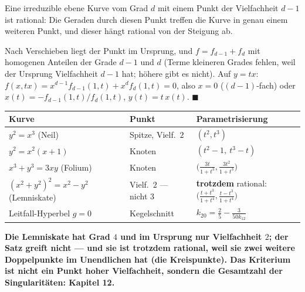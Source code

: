 \begin{merksatz}
Eine irreduzible ebene Kurve vom Grad $d$ mit einem Punkt der Vielfachheit $d - 1$ ist rational: Die Geraden durch diesen Punkt treffen die Kurve in genau einem weiteren Punkt, und dieser hängt rational von der Steigung ab.

Nach Verschieben liegt der Punkt im Ursprung, und $f = f_{d-1} + f_d$ mit homogenen Anteilen der Grade $d - 1$ und $d$ (Terme kleineren Grades fehlen, weil der Ursprung Vielfachheit $d - 1$ hat; höhere gibt es nicht). Auf $y = tx$: $f(x, tx) = x^{d-1}f_{d-1}(1, t) + x^{d}f_d(1, t) = 0$, also $x = 0$ ($(d-1)$-fach) oder $x(t) = -f_{d-1}(1, t)/f_d(1, t)$, $y(t) = t\,x(t)$. $\blacksquare$

\begin{center}
{\small
\renewcommand{\arraystretch}{1.5}
\begin{tabular}{@{}P{3.0cm}P{2.0cm}P{3.6cm}@{}}
\toprule
\textbf{Kurve} & \textbf{Punkt} & \textbf{Parametrisierung}\\
\midrule
$y^{2} = x^{3}$ (Neil) & Spitze, Vielf.\ $2$ & $(t^{2}, t^{3})$\\
$y^{2} = x^{2}(x + 1)$ & Knoten & $(t^{2} - 1,\ t^{3} - t)$\\
$x^{3} + y^{3} = 3xy$ (Folium) & Knoten & $\bigl(\frac{3t}{1 + t^{3}}, \frac{3t^{2}}{1 + t^{3}}\bigr)$\\
$(x^{2} + y^{2})^{2} = x^{2} - y^{2}$ (Lemniskate) & Vielf.\ $2$ --- nicht $3$ & \textbf{trotzdem} rational: $\bigl(\frac{t + t^{3}}{1 + t^{4}}, \frac{t - t^{3}}{1 + t^{4}}\bigr)$\\
Leitfall-Hyperbel $g = 0$ & Kegel\-schnitt & $k_{20} = \tfrac25 - \frac{3}{50k_{12}}$\\
\bottomrule
\end{tabular}}
\end{center}

\begin{center}
\begin{minipage}{0.9\textwidth}
\textbf{Die Lemniskate hat Grad $4$ und im Ursprung nur Vielfachheit $2$; der Satz greift nicht --- und sie ist trotzdem rational, weil sie zwei weitere Doppelpunkte im Unendlichen hat (die Kreispunkte). Das Kriterium ist nicht ein Punkt hoher Vielfachheit, sondern die Gesamtzahl der Singularitäten: Kapitel 12.}
\end{minipage}
\end{center}


\end{merksatz}
